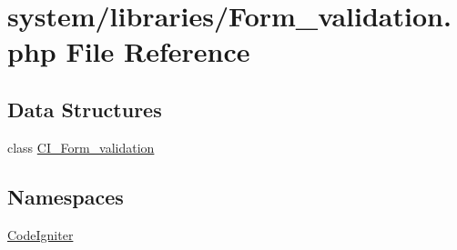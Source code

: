 \hypertarget{_form__validation_8php}{\section{system/libraries/\-Form\-\_\-validation.php File Reference}
\label{_form__validation_8php}
}
\subsection*{Data Structures}
\begin{DoxyCompactItemize}
\item 
class \hyperlink{class_c_i___form__validation}{C\-I\-\_\-\-Form\-\_\-validation}
\end{DoxyCompactItemize}
\subsection*{Namespaces}
\begin{DoxyCompactItemize}
\item 
\hyperlink{namespace_code_igniter}{Code\-Igniter}
\end{DoxyCompactItemize}
